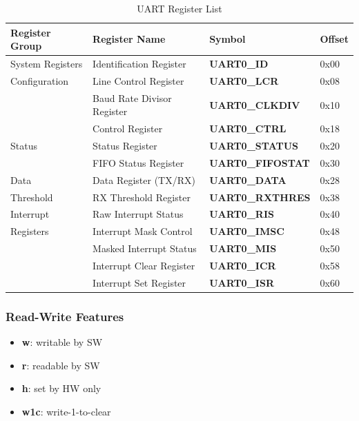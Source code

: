 \begin{table}[H]
\caption{UART Register List}
\label{tab:asUartRegList}
\centering
\begin{tabularx}{\textwidth}{|l |X |l |l|}
  \hline
  Register Group & Register Name & Symbol & Offset \\
  \hline
  \hline
  System Registers  & Identification Register     & \textbf{UART0\_ID}       & 0x00 \\
  \hline
  Configuration     & Line Control Register       & \textbf{UART0\_LCR}      & 0x08 \\
                    & Baud Rate Divisor Register  & \textbf{UART0\_CLKDIV}   & 0x10 \\
                    & Control Register            & \textbf{UART0\_CTRL}     & 0x18 \\
  \hline
  Status            & Status Register             & \textbf{UART0\_STATUS}   & 0x20 \\
                    & FIFO Status Register        & \textbf{UART0\_FIFOSTAT} & 0x30 \\
  \hline
  Data              & Data Register (TX/RX)       & \textbf{UART0\_DATA}     & 0x28 \\
  \hline
  Threshold         & RX Threshold Register       & \textbf{UART0\_RXTHRES}  & 0x38 \\
  \hline
  Interrupt         & Raw Interrupt Status        & \textbf{UART0\_RIS}      & 0x40 \\
  Registers         & Interrupt Mask Control      & \textbf{UART0\_IMSC}     & 0x48 \\
                    & Masked Interrupt Status     & \textbf{UART0\_MIS}      & 0x50 \\
                    & Interrupt Clear Register    & \textbf{UART0\_ICR}      & 0x58 \\
                    & Interrupt Set Register      & \textbf{UART0\_ISR}      & 0x60 \\
  \hline
\end{tabularx}
\end{table}

\subsubsection{Read-Write Features}
\begin{itemize}
  \item \textbf{w}: writable by SW
  \item \textbf{r}: readable by SW
  \item \textbf{h}: set by HW only
  \item \textbf{w1c}: write-1-to-clear
\end{itemize}

